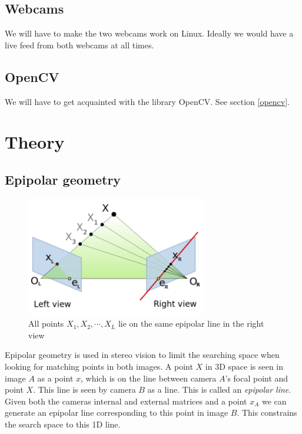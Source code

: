\documentclass[a4paper]{article}
\begin{document}
\subsection{Webcams} 
We will have to make the two webcams work on Linux. Ideally we would
have a live feed from both webcams at all times.

\subsection{OpenCV} 
We will have to get acquainted with the library OpenCV. See section
\ref{opencv}.

\section{Theory}

\subsection{Epipolar geometry}
\label{epipolar}

\begin{figure}[h!]
  \centering
  \includegraphics[width=0.7\textwidth]{Epipolar_geometry}
  \caption{All points $X_{1}, X_{2}, \cdots, X_{L}$ lie on the same
epipolar line in the right view}
  \label{fig:epipole}
\end{figure}

Epipolar geometry is used in stereo vision to limit the searching
space when looking for matching points in both images. A point $X$ in
3D space is seen in image $A$ as a point $x$, which is on the line
between camera $A$'s focal point and point $X$. This line is seen by
camera $B$ as a line. This is called an \emph{epipolar line}. Given
both the cameras internal and external matrices and a point $x_A$ we
can generate an epipolar line corresponding to this point in image
$B$. This constrains the search space to this 1D line.
\end{document}
